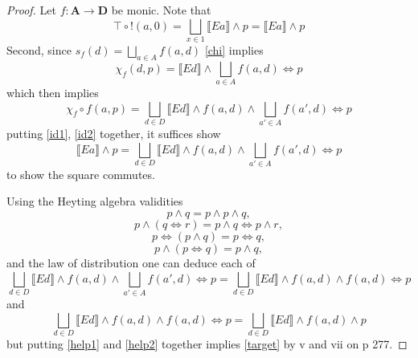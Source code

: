 \documentclass{article}
\newcommand{\A}{\mathbf{A}}
\newcommand{\D}{\mathbf{D}}
\newcommand{\lb}{\llbracket}
\newcommand{\rb}{\rrbracket}
\theoremstyle{definition}
\begin{document}
\begin{proof}
    Let $f : \A \to \D$ be monic. Note that
    \begin{equation}\label{id1}
        \top \circ ! (a, 0) = \bigsqcup_{x \in 1}  \lb Ea \rb \wedge p = \lb Ea \rb \wedge p
    \end{equation}
    Second, since $s_f(d) = \bigsqcup_{a \in A} f(a, d)$ \eqref{chi} implies
    \begin{equation}\label{help}
        \chi_f(d, p)  = \lb Ed \rb \wedge \bigsqcup_{a \in A} f(a, d) \Leftrightarrow p
    \end{equation}
    which then implies
    \begin{equation}\label{id2}
        \chi_f \circ f(a, p)  = \bigsqcup_{d \in D} \lb Ed \rb \wedge f(a, d) \wedge \bigsqcup_{a' \in A} f(a', d) \Leftrightarrow p
    \end{equation}
    putting \eqref{id1}, \eqref{id2} together, it suffices show 
    \begin{equation}\label{target}
        \lb Ea \rb \wedge p = \bigsqcup_{d \in D} \lb Ed \rb \wedge f(a, d) \wedge \bigsqcup_{a' \in A} f(a', d) \Leftrightarrow p
    \end{equation}
    to show the square commutes.

    Using the Heyting algebra validities
    \[p \wedge q = p \wedge p \wedge q,\] 
    \[p \wedge (q \Leftrightarrow r) = p \wedge q \Leftrightarrow p \wedge r,\]
    \[p \Leftrightarrow (p \wedge q) = p \Leftrightarrow q,\] 
    \[ p \wedge (p \Leftrightarrow q) = p \wedge q,\]
    and the law of distribution one can deduce each of
    \begin{equation}\label{help1}
        \bigsqcup_{d \in D} \lb Ed \rb \wedge f(a, d) \wedge \bigsqcup_{a' \in A} f(a', d) \Leftrightarrow p = \bigsqcup_{d \in D} \lb Ed \rb \wedge f(a, d) \wedge f(a, d) \Leftrightarrow p
    \end{equation}
    and
    \begin{equation}\label{help2}
        \bigsqcup_{d \in D} \lb Ed \rb \wedge f(a, d) \wedge  f(a, d) \Leftrightarrow p = \bigsqcup_{d \in D} \lb Ed \rb \wedge f(a, d) \wedge p 
    \end{equation}
    but putting \eqref{help1} and \eqref{help2} together implies \eqref{target} by v and vii on p 277. 


\end{proof}
\end{document}
